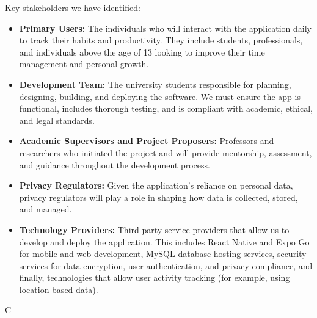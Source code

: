 Key stakeholders we have identified:
\begin{itemize}
    \item \textbf{Primary Users:} The individuals who will interact with the application daily to track their habits and productivity. They include students, professionals, and individuals above the age of 13 looking to improve their time management and personal growth.

    \item \textbf{Development Team:} The university students responsible for planning, designing, building, and deploying the software. We must ensure the app is functional, includes thorough testing, and is compliant with academic, ethical, and legal standards.

    \item \textbf{Academic Supervisors and Project Proposers:} Professors and researchers who initiated the project and will provide mentorship, assessment, and guidance throughout the development process.

    \item \textbf{Privacy Regulators:} Given the application’s reliance on personal data, privacy regulators will play a role in shaping how data is collected, stored, and managed.

    \item \textbf{Technology Providers:} Third-party service providers that allow us to develop and deploy the application. This includes React Native and Expo Go for mobile and web development, MySQL database hosting services, security services for data encryption, user authentication, and privacy compliance, and finally, technologies that allow user activity tracking (for example, using location-based data).
\end{itemize}
C
